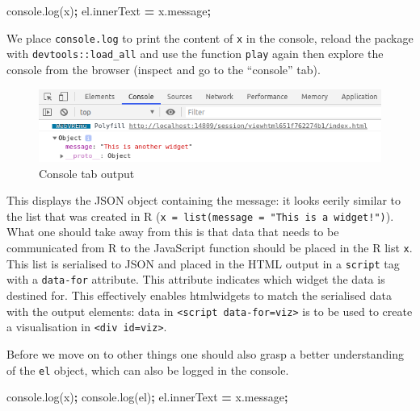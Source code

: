 \documentclass[
]{krantz}
\makeatletter
\newenvironment{Shaded}{\begin{snugshade}}{\end{snugshade}}
\newcommand{\AttributeTok}[1]{\textcolor[rgb]{0.61,0.61,0.61}{#1}}
\newcommand{\NormalTok}[1]{#1}
\newcommand{\OperatorTok}[1]{\textcolor[rgb]{0.43,0.43,0.43}{\textbf{#1}}}
\newcommand{\VariableTok}[1]{\textcolor[rgb]{0,0,0}{#1}}
\newenvironment{kframe}{%
\medskip{}
\setlength{\fboxsep}{.8em}
 \def\at@end@of@kframe{}%
 \ifinner\ifhmode%
  \def\at@end@of@kframe{\end{minipage}}%
  \begin{minipage}{\columnwidth}%
 \fi\fi%
 \def\FrameCommand##1{\hskip\@totalleftmargin \hskip-\fboxsep
 \colorbox{shadecolor}{##1}\hskip-\fboxsep
     \hskip-\linewidth \hskip-\@totalleftmargin \hskip\columnwidth}%
 \MakeFramed {\advance\hsize-\width
   \@totalleftmargin\z@ \linewidth\hsize
   \@setminipage}}%
 {\par\unskip\endMakeFramed%
 \at@end@of@kframe}
\renewenvironment{Shaded}{\begin{kframe}}{\end{kframe}}
\makeatother
\begin{document}
\begin{Shaded}
\begin{Highlighting}[]
\VariableTok{console}\NormalTok{.}\AttributeTok{log}\NormalTok{(x)}\OperatorTok{;}
\VariableTok{el}\NormalTok{.}\AttributeTok{innerText} \OperatorTok{=} \VariableTok{x}\NormalTok{.}\AttributeTok{message}\OperatorTok{;}
\end{Highlighting}
\end{Shaded}

We place \texttt{console.log} to print the content of \texttt{x} in the console, reload the package with \texttt{devtools::load\_all} and use the function \texttt{play} again then explore the console from the browser (inspect and go to the ``console'' tab).

\begin{figure}
\centering
\includegraphics{images/playground-console-x.png}
\caption{Console tab output}
\end{figure}

This displays the JSON object containing the message: it looks eerily similar to the list that was created in R (\texttt{x\ =\ list(message\ =\ "This\ is\ a\ widget!")}). What one should take away from this is that data that needs to be communicated from R to the JavaScript function should be placed in the R list \texttt{x}. This list is serialised to JSON and placed in the HTML output in a \texttt{script} tag with a \texttt{data-for} attribute. This attribute indicates which widget the data is destined for. This effectively enables htmlwidgets to match the serialised data with the output elements: data in \texttt{\textless{}script\ data-for=\textquotesingle{}viz\textquotesingle{}\textgreater{}} is to be used to create a visualisation in \texttt{\textless{}div\ id=\textquotesingle{}viz\textquotesingle{}\textgreater{}}.

Before we move on to other things one should also grasp a better understanding of the \texttt{el} object, which can also be logged in the console.

\begin{Shaded}
\begin{Highlighting}[]
\VariableTok{console}\NormalTok{.}\AttributeTok{log}\NormalTok{(x)}\OperatorTok{;}
\VariableTok{console}\NormalTok{.}\AttributeTok{log}\NormalTok{(el)}\OperatorTok{;}
\VariableTok{el}\NormalTok{.}\AttributeTok{innerText} \OperatorTok{=} \VariableTok{x}\NormalTok{.}\AttributeTok{message}\OperatorTok{;}
\end{Highlighting}
\end{Shaded}
\end{document}
